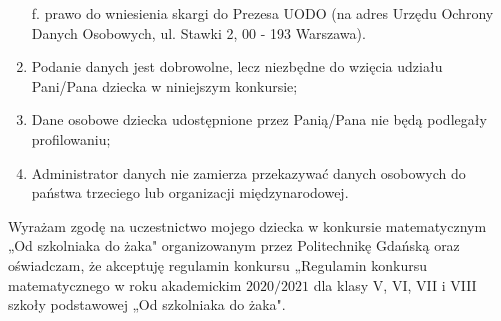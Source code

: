 \documentclass[10pt]{article}
\begin{document}
\begin{enumerate}
f. prawo do wniesienia skargi do Prezesa UODO (na adres Urzędu Ochrony Danych Osobowych, ul. Stawki 2, 00 - 193 Warszawa).
  \item Podanie danych jest dobrowolne, lecz niezbędne do wzięcia udziału Pani/Pana dziecka w niniejszym konkursie;
  \item Dane osobowe dziecka udostępnione przez Panią/Pana nie będą podlegały profilowaniu;
  \item Administrator danych nie zamierza przekazywać danych osobowych do państwa trzeciego lub organizacji międzynarodowej.
\end{enumerate}

Wyrażam zgodę na uczestnictwo mojego dziecka w konkursie matematycznym „Od szkolniaka do żaka" organizowanym przez Politechnikę Gdańską oraz oświadczam, że akceptuję regulamin konkursu „Regulamin konkursu matematycznego w roku akademickim \(2020 / 2021\) dla klasy V, VI, VII i VIII szkoły podstawowej „Od szkolniaka do żaka".
\end{document}
